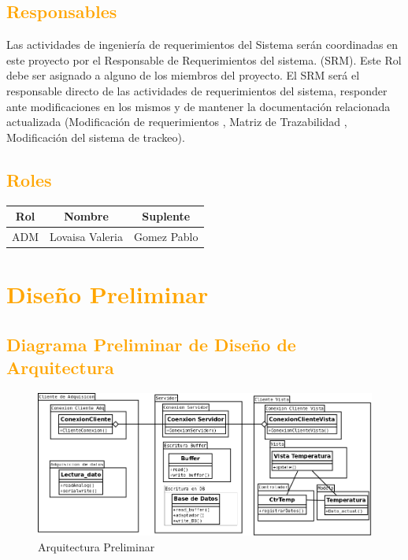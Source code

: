 \subsection{\textcolor{orange}{Responsables}}
Las actividades de ingeniería de requerimientos del Sistema serán coordinadas en
este proyecto por el Responsable de Requerimientos del sistema. (SRM). Este Rol
debe ser asignado a alguno de los miembros del proyecto.
El SRM será el responsable directo de las actividades de requerimientos del
sistema, responder ante modificaciones en los mismos  y de mantener la
documentación relacionada actualizada (Modificación de requerimientos , Matriz
de Trazabilidad , Modificación del sistema de trackeo).


\subsection{\textcolor{orange}{Roles}}
\begin{table}[!h]
\begin{center}
\begin{tabular}{|c|c|c|}
\hline
\rowcolor[RGB]{255,127,0} Rol & Nombre & Suplente\\
\hline
ADM & Lovaisa Valeria & Gomez Pablo\\
\hline
\end{tabular}
\end{center}
\end{table}

\newpage
\section{\textcolor{orange}{Diseño Preliminar}}
\subsection{\textcolor{orange}{Diagrama Preliminar de Diseño de Arquitectura}}
\begin{figure}[h!]
 \begin{center}
  \includegraphics[width=1\textwidth,keepaspectratio=true]{./img/arqprelim.png}
  \caption{Arquitectura Preliminar}
  \label{fig:esquema}
 \end{center}
\end{figure}

